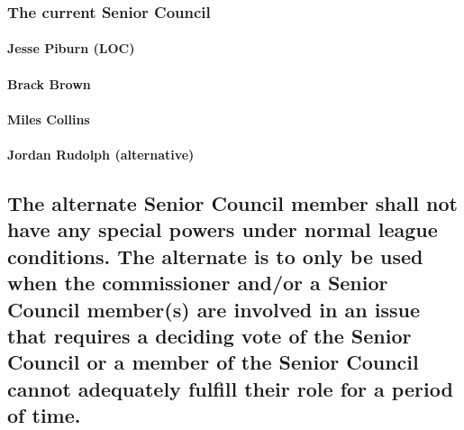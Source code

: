 \documentclass[
]{book}
\begin{document}
\hypertarget{the-current-senior-council}{%
\subsubsection{The current Senior Council}\label{the-current-senior-council}}

\hypertarget{jesse-piburn-loc}{%
\paragraph*{Jesse Piburn (LOC)}\label{jesse-piburn-loc}}

\hypertarget{brack-brown}{%
\paragraph*{Brack Brown}\label{brack-brown}}

\hypertarget{miles-collins}{%
\paragraph*{Miles Collins}\label{miles-collins}}

\hypertarget{jordan-rudolph-alternative}{%
\paragraph*{Jordan Rudolph (alternative)}\label{jordan-rudolph-alternative}}

\hypertarget{the-alternate-senior-council-member-shall-not-have-any-special-powers-under-normal-league-conditions.-the-alternate-is-to-only-be-used-when-the-commissioner-andor-a-senior-council-members-are-involved-in-an-issue-that-requires-a-deciding-vote-of-the-senior-council-or-a-member-of-the-senior-council-cannot-adequately-fulfill-their-role-for-a-period-of-time.}{%
\subsection{The alternate Senior Council member shall not have any special powers under normal league conditions. The alternate is to only be used when the commissioner and/or a Senior Council member(s) are involved in an issue that requires a deciding vote of the Senior Council or a member of the Senior Council cannot adequately fulfill their role for a period of time.}\label{the-alternate-senior-council-member-shall-not-have-any-special-powers-under-normal-league-conditions.-the-alternate-is-to-only-be-used-when-the-commissioner-andor-a-senior-council-members-are-involved-in-an-issue-that-requires-a-deciding-vote-of-the-senior-council-or-a-member-of-the-senior-council-cannot-adequately-fulfill-their-role-for-a-period-of-time.}}
\end{document}
